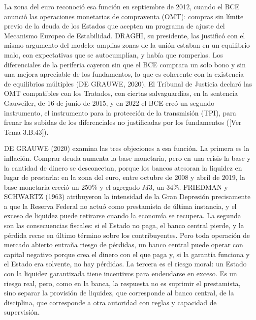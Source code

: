 \documentclass[10pt,a4paper]{article}
\newcommand{\authorfont}[1]{{\fontfamily{EBGaramond-TLF}\selectfont #1}}
\begin{document}
La zona del euro reconoció esa función en septiembre de 2012, cuando el BCE anunció las operaciones monetarias de compraventa (OMT): compras sin límite previo de la deuda de los Estados que acepten un programa de ajuste del Mecanismo Europeo de Estabilidad. DRAGHI, su presidente, las justificó con el mismo argumento del modelo: amplias zonas de la unión estaban en un equilibrio malo, con expectativas que se autocumplían, y había que romperlas. Los diferenciales de la periferia cayeron sin que el BCE comprara un solo bono y sin una mejora apreciable de los fundamentos, lo que es coherente con la existencia de equilibrios múltiples (DE GRAUWE, 2020). El Tribunal de Justicia declaró las OMT compatibles con los Tratados, con ciertas salvaguardias, en la sentencia Gauweiler, de 16 de junio de 2015, y en 2022 el BCE creó un segundo instrumento, el instrumento para la protección de la transmisión (TPI), para frenar las subidas de los diferenciales no justificadas por los fundamentos ([\authorfont{Ver Tema 3.B.43}]).

DE GRAUWE (2020) examina las tres objeciones a esa función. La primera es la inflación. Comprar deuda aumenta la base monetaria, pero en una crisis la base y la cantidad de dinero se desconectan, porque los bancos atesoran la liquidez en lugar de prestarla: en la zona del euro, entre octubre de 2008 y abril de 2019, la base monetaria creció un $250\%$ y el agregado $M3$, un $34\%$. FRIEDMAN y SCHWARTZ (1963) atribuyeron la intensidad de la Gran Depresión precisamente a que la Reserva Federal no actuó como prestamista de última instancia, y el exceso de liquidez puede retirarse cuando la economía se recupera. La segunda son las consecuencias fiscales: si el Estado no paga, el banco central pierde, y la pérdida recae en último término sobre los contribuyentes. Pero toda operación de mercado abierto entraña riesgo de pérdidas, un banco central puede operar con capital negativo porque crea el dinero con el que paga y, si la garantía funciona y el Estado era solvente, no hay pérdidas. La tercera es el riesgo moral: un Estado con la liquidez garantizada tiene incentivos para endeudarse en exceso. Es un riesgo real, pero, como en la banca, la respuesta no es suprimir el prestamista, sino separar la provisión de liquidez, que corresponde al banco central, de la disciplina, que corresponde a otra autoridad con reglas y capacidad de supervisión.
\end{document}
